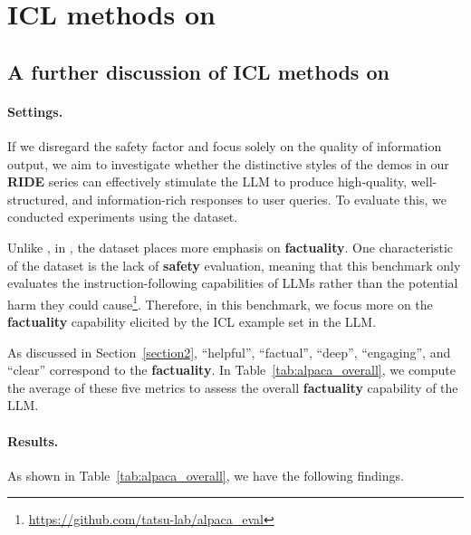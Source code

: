 \section{ICL methods on \alpaca{}}
\label{append:alpaca_all}

\subsection{A further discussion of ICL methods on \alpaca{}}
\label{append:alpaca_discuss}

\paragraph{Settings.} If we disregard the safety factor and focus solely on the quality of information output, we aim to investigate whether the distinctive styles of the demos in our \textbf{RIDE} series can effectively stimulate the LLM to produce high-quality, well-structured, and information-rich responses to user queries. To evaluate this, we conducted experiments using the \alpaca{} dataset.

Unlike \dataname{}, in \alpaca{}, the dataset places more emphasis on \textbf{\color{myblue} factuality}. 
One characteristic of the \alpaca{} dataset is the lack of \textbf{\color{myred} safety} evaluation, meaning that this benchmark only evaluates the instruction-following capabilities of LLMs rather than the potential harm they could cause\footnote{\url{https://github.com/tatsu-lab/alpaca_eval}}. Therefore, in this benchmark, we focus more on the \textbf{\color{myblue} factuality} capability elicited by the ICL example set in the LLM.

As discussed in Section~\ref{section2}, ``helpful'', ``factual'', ``deep'', ``engaging'', and ``clear'' correspond to the \textbf{\color{myblue} factuality}.
In Table~\ref{tab:alpaca_overall}, we compute the average of these five metrics to assess the overall \textbf{\color{myblue} factuality} capability of the LLM.

\paragraph{Results.} As shown in Table~\ref{tab:alpaca_overall}, we have the following findings.


